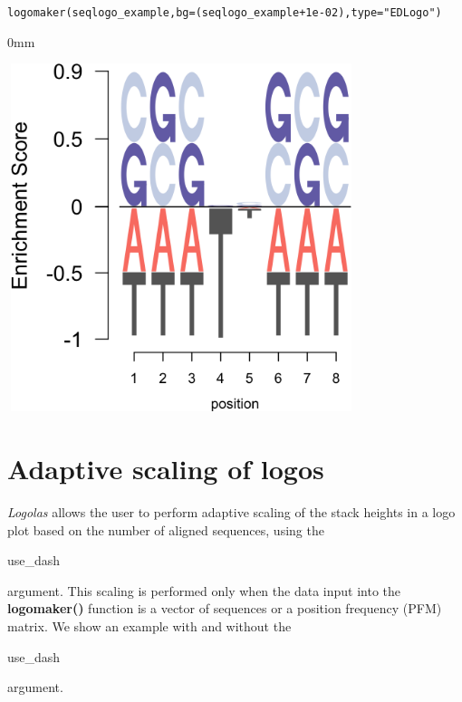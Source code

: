 \documentclass[12pt]{article}\usepackage[]{graphicx}\usepackage[usenames,dvipsnames]{color}
\newcommand{\hlnum}[1]{\textcolor[rgb]{0.816,0.125,0.439}{#1}}%
\newcommand{\hlstr}[1]{\textcolor[rgb]{0.251,0.627,0.251}{#1}}%
\newcommand{\hlopt}[1]{\textcolor[rgb]{0,0,0}{#1}}%
\newcommand{\hlstd}[1]{\textcolor[rgb]{0.251,0.251,0.251}{#1}}%
\newcommand{\hlkwc}[1]{\textcolor[rgb]{0.251,0.251,0.251}{#1}}%
\newcommand{\hlkwd}[1]{\textcolor[rgb]{0.878,0.439,0.125}{#1}}%
\newenvironment{knitrout}{}{} %
\newcommand{\Logolas}{\textit{Logolas}}
\begin{document}
\begin{knitrout}
\color{fgcolor}\begin{kframe}
\begin{alltt}
\hlkwd{logomaker}\hlstd{(seqlogo_example,} \hlkwc{bg}\hlstd{=(seqlogo_example}\hlopt{+}\hlnum{1e-02}\hlstd{),} \hlkwc{type} \hlstd{=} \hlstr{"EDLogo"}\hlstd{)}
\end{alltt}
\end{kframe}\begin{adjustwidth}{\fltoffset}{0mm}

\includegraphics[width=4in,height=4in]{figure/bg2-1} \hfill{}

\end{adjustwidth}
\end{knitrout}

\section{Adaptive scaling of logos}

\Logolas{} allows the user to perform adaptive scaling of the stack heights in a logo plot based on the
number of aligned sequences, using the \begin{verb} use_dash \end{verb} argument. This scaling is performed
only when the data input into the \textbf{logomaker()} function is a vector of sequences or a position frequency (PFM) matrix. We show an example with and without the \begin{verb} use_dash \end{verb} argument.
\end{document}
